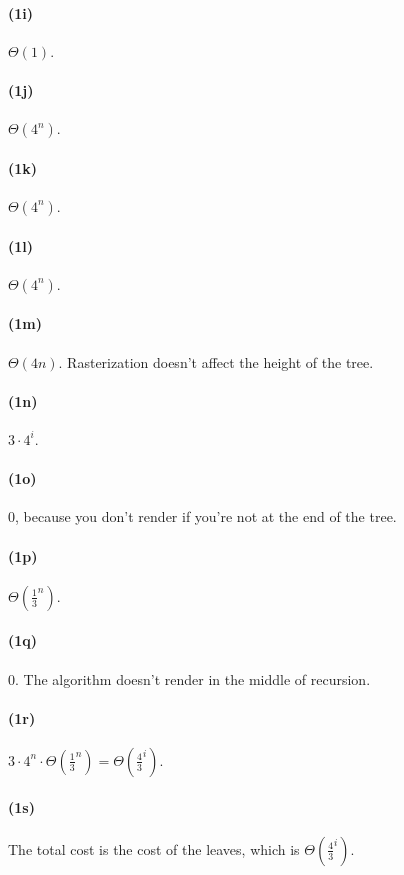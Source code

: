 \documentclass{article}
\begin{document}
\paragraph{(1i)}
$\Theta(1)$.

\paragraph{(1j)}
$\Theta(4^n)$.

\paragraph{(1k)}
$\Theta(4^n)$.

\paragraph{(1l)}
$\Theta(4^n)$.

\paragraph{(1m)}
$\Theta(4n)$. Rasterization doesn't affect the height of the tree.

\paragraph{(1n)}
$3\cdot4^i$.

\paragraph{(1o)}
0, because you don't render if you're not at the end of the tree. 

\paragraph{(1p)}
$\Theta(\frac{1}{3}^n)$.

\paragraph{(1q)}
0. The algorithm doesn't render in the middle of recursion.

\paragraph{(1r)}
$3\cdot4^n\cdot\Theta(\frac{1}{3}^n) = \Theta(\frac{4}{3}^i)$.

\paragraph{(1s)}
The total cost is the cost of the leaves, which is $\Theta(\frac{4}{3}^i)$.
\end{document}
